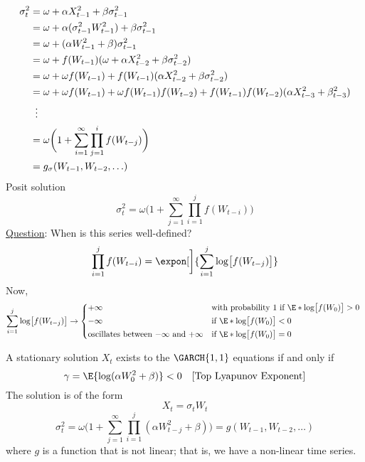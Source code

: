 \begin{align*}
    \sigma_t^2
     & =\omega+\alpha X_{t-1}^2+\beta \sigma_{t-1}^2                                                              \\
     & =\omega+\alpha(\sigma_{t-1}^2 W_{t-1}^2)+\beta \sigma_{t-1}^2                                              \\
     & =\omega+(\alpha W_{t-1}^2+\beta)\sigma_{t-1}^2                                                             \\
     & =\omega+f(W_{t-1})(\omega+\alpha X_{t-2}^2+\beta \sigma_{t-2}^2)                                           \\
     & =\omega+\omega f(W_{t-1})+f(W_{t-1})(\alpha X_{t-2}^2+\beta \sigma_{t-2}^2)                                \\
     & =\omega+\omega f(W_{t-1})+\omega f(W_{t-1})f(W_{t-2})+f(W_{t-1})f(W_{t-2})(\alpha X_{t-3}^2+\beta_{t-3}^2) \\
     & \vdotswithin{=}                                                                                            \\
     & =\omega\biggl(1+\sum_{i=1}^{\infty} \prod_{j=1}^i f(W_{t-j})\biggr)                                        \\
     & =g_\sigma (W_{t-1},W_{t-2},\ldots)
\end{align*}
Posit solution
\[ \sigma_t^2=\omega\biggl(1+\sum_{j=1}^{\infty} \prod_{i=1}^j f(W_{t-i})\biggr) \]
\underline{Question}: When is this series well-defined?
\[ \prod_{i=1}^j f(W_{t-i})=\expon[\bigg]{\sum_{i=1}^{j} \log\bigl[f(W_{t-j})\bigr]} \]
Now,
\[ \sum_{i=1}^{j} \log\bigl[f(W_{t-j})\bigr]\to
    \begin{cases*}
        +\infty                                               & with probability $ 1 $ if $ \E*{\log\bigl[f(W_0)\bigr]}>0 $ \\
        -\infty                                               & if $ \E*{\log\bigl[f(W_0)\bigr]}<0 $                        \\
        \text{oscillates between $ -\infty $ and $ +\infty $} & if $\E*{\log\bigl[f(W_0)\bigr]}=0$
    \end{cases*} \]
\begin{Theorem}{}{}
    A stationary solution $ X_t $ exists to the $ \GARCH{1,1} $ equations if and only if
    \[ \gamma=\E{\log(\alpha W_0^2+\beta)}<0\quad\text{[Top Lyapunov Exponent]} \]
    The solution is of the form
    \[ X_t=\sigma_t W_t \]
    \[ \sigma_t^2=\omega\biggl(1+\sum_{j=1}^{\infty} \prod_{i=1}^j (\alpha W_{t-j}^2+\beta)\biggr)=
        g(W_{t-1},W_{t-2},\ldots) \]
    where $ g $ is a function that is not linear; that is, we have a non-linear time series.
\end{Theorem}
